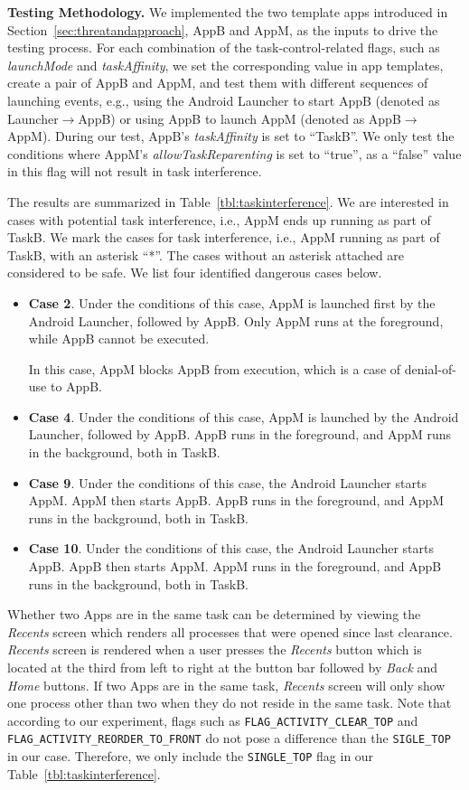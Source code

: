 \documentclass[letterpaper,12pt]{article}
\begin{document}
{\noindent \bf Testing Methodology.} We implemented the two template
apps introduced in Section~\ref{sec:threatandapproach}, AppB and AppM, as the
inputs to drive the testing process.  For each combination of the
task-control-related flags, such as {\em launchMode} and {\em
  taskAffinity}, we set the corresponding value in app templates,
create a pair of AppB and AppM, and test them with different sequences
of launching events, e.g., using the Android Launcher to start AppB
(denoted as Launcher$\rightarrow$AppB) or using AppB to launch AppM
(denoted as AppB$\rightarrow$AppM). During our test, AppB's {\em
  taskAffinity} is set to ``TaskB''.  We only test the conditions
where AppM's {\em allowTaskReparenting} is set to ``true'', as a
``false'' value in this flag will not result in task interference.

The results are summarized in Table~\ref{tbl:taskinterference}.  We
are interested in cases with potential task interference, i.e., AppM
ends up running as part of TaskB.  We mark the cases for task
interference, i.e., AppM running as part of TaskB, with an asterisk
``*''. The cases without an asterisk attached are considered to be
safe. We list four identified dangerous cases below.

\begin{itemize}
  \item {\bf Case 2}. Under the conditions of this case, AppM is
    launched first by the Android Launcher, followed by AppB. Only
    AppM runs at the foreground, while AppB cannot be executed.

    In this case, AppM blocks AppB from execution, which is a case
    of denial-of-use to AppB.
  \item {\bf Case 4}. Under the conditions of this case, AppM is
    launched by the Android Launcher, followed by AppB. AppB runs in
    the foreground, and AppM runs in the background, both in TaskB.
  \item {\bf Case 9}. Under the conditions of this case, the Android
    Launcher starts AppM. AppM then starts AppB. AppB runs in
    the foreground, and AppM runs in the background, both in TaskB.
  \item {\bf Case 10}. Under the conditions of this case, the Android
    Launcher starts AppB. AppB then starts AppM. AppM runs in
    the foreground, and AppB runs in the background, both in TaskB.
\end{itemize}

Whether two Apps are in the same task can be determined by
viewing the \emph{Recents} screen which renders all processes that
were opened since last clearance\cite{recents}. \emph{Recents} screen
is rendered when a user presses the \emph{Recents} button which is
located at the third from left to right at the button bar followed by
\emph{Back} and \emph{Home} buttons. If two Apps are in the same task,
\emph{Recents} screen will only show one process other than two when
they do not reside in the same task. Note that according to our
experiment, flags such as \texttt{FLAG\_ACTIVITY\_CLEAR\_TOP} and
\texttt{FLAG\_ACTIVITY\_REORDER\_TO\_FRONT} do not pose a difference
than the \texttt{SIGLE\_TOP} in our case. Therefore, we only include
the \texttt{SINGLE\_TOP} flag in our Table~\ref{tbl:taskinterference}.
\end{document}
